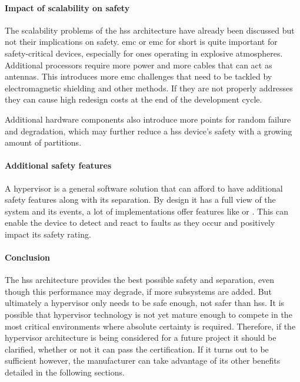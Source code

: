 
\paragraph{Impact of scalability on safety}
The scalability problems of the \acrshort{hss} architecture have already been discussed but not their implications on safety. \acrlong{emc} or \acrshort{emc} for short is quite important for safety-critical devices, especially for ones operating in explosive atmospheres. Additional processors require more power and more cables that can act as antennas. This introduces more \acrshort{emc} challenges that need to be tackled by electromagnetic shielding and other methods. If they are not properly addresses they can cause high redesign costs at the end of the development cycle.

Additional hardware components also introduce more points for random failure and degradation, which may further reduce a \acrshort{hss} device's safety with a growing amount of partitions.

\paragraph{Additional safety features}
A hypervisor is a general software solution that can afford to have additional safety features along with its separation. By design it has a full view of the system and its events, a lot of implementations offer features like  or . This can enable the device to detect and react to faults as they occur and positively impact its safety rating.

\paragraph{Conclusion}
The \acrshort{hss} architecture provides the best possible safety and separation, even though this performance may degrade, if more subsystems are added. But ultimately a hypervisor only needs to be safe enough, not safer than \acrshort{hss}. It is possible that hypervisor technology is not yet mature enough to compete in the most critical environments where absolute certainty is required. Therefore, if the hypervisor architecture is being considered for a future project it should be clarified, whether or not it can pass the certification. If it turns out to be sufficient however, the manufacturer can take advantage of its other benefits detailed in the following sections.


